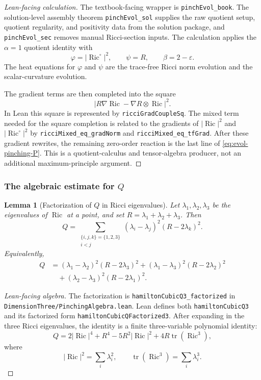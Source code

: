 \documentclass[11pt]{article}
\theoremstyle{plain}
\newtheorem{lemma}[theorem]{Lemma}
\theoremstyle{definition}
\theoremstyle{remark}
\newcommand{\Ric}{\operatorname{Ric}}
\newcommand{\tr}{\operatorname{tr}}
\newcommand{\norm}[1]{\left|#1\right|}
\newcommand{\eps}{\varepsilon}
\newcommand{\leanref}[1]{\nolinkurl{#1}}
\newcommand{\leanfile}[1]{\nolinkurl{#1}}
\newcommand{\rffile}[1]{\leanfile{#1}}
\begin{document}
\begin{proof}[Lean-facing calculation]
The textbook-facing wrapper is \leanref{pinchEvol_book}.  The solution-level
assembly theorem \leanref{pinchEvol_sol} supplies the raw quotient setup,
quotient regularity, and positivity data from the solution package, and
\leanref{pinchEvol_sec} removes manual Ricci-section inputs.  The calculation
applies the \(\alpha=1\) quotient identity with
\[
  \varphi=\norm{\Ric^\circ}^2,
  \qquad
  \psi=R,
  \qquad
  \beta=2-\eps.
\]
The heat equations for \(\varphi\) and \(\psi\) are the trace-free Ricci norm
evolution and the scalar-curvature evolution.

The gradient terms are then completed into the square
\[
  \norm{R\nabla\Ric-\nabla R\otimes\Ric}^2.
\]
In Lean this square is represented by \leanref{ricciGradCoupleSq}.  The mixed
term needed for the square completion is related to the gradients of
\(\norm{\Ric}^2\) and \(\norm{\Ric^\circ}^2\) by
\leanref{ricciMixed_eq_gradNorm} and \leanref{ricciMixed_eq_tfGrad}.  After
these gradient rewrites, the remaining zero-order reaction is the last line of
\eqref{eq:evol-pinching-P}.  This is a quotient-calculus and tensor-algebra
producer, not an additional maximum-principle argument.
\end{proof}

\subsubsection{The algebraic estimate for \texorpdfstring{$Q$}{Q}}

\begin{lemma}[Factorization of \texorpdfstring{$Q$}{Q} in Ricci eigenvalues]
\label{lem:Q-factorization}
Let $\lambda_1,\lambda_2,\lambda_3$ be the eigenvalues of $\Ric$ at a point,
and set $R=\lambda_1+\lambda_2+\lambda_3$. Then
\[
Q
=
\sum_{\substack{\{i,j,k\}=\{1,2,3\}\\ i<j}}
(\lambda_i-\lambda_j)^2(R-2\lambda_k)^2.
\]
Equivalently,
\begin{align*}
Q
&=
(\lambda_1-\lambda_2)^2(R-2\lambda_3)^2
+(\lambda_1-\lambda_3)^2(R-2\lambda_2)^2
\\
&\quad
+(\lambda_2-\lambda_3)^2(R-2\lambda_1)^2.
\end{align*}
\end{lemma}

\begin{proof}[Lean-facing algebra]
The factorization is \leanref{hamiltonCubicQ3_factorized} in
\rffile{DimensionThree/PinchingAlgebra.lean}.  Lean defines both
\leanref{hamiltonCubicQ3} and its factorized form
\leanref{hamiltonCubicQFactorized3}.  After expanding in the three Ricci
eigenvalues, the identity is a finite three-variable polynomial identity:
\[
Q=2\norm{\Ric}^4+R^4-5R^2\norm{\Ric}^2+4R\tr(\Ric^3),
\]
where
\[
\norm{\Ric}^2=\sum_i\lambda_i^2,
\qquad
\tr(\Ric^3)=\sum_i\lambda_i^3.
\]
\end{proof}
\end{document}
